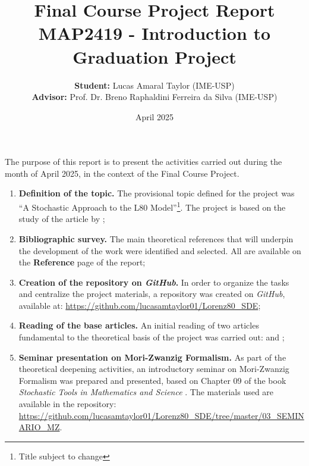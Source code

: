 \documentclass[12pt]{article}
\title{Final Course Project Report \\ \large{MAP2419 - Introduction to Graduation Project}}
\date{April 2025}
\author{
\textbf{Student:} Lucas Amaral Taylor (IME-USP)\\
\textbf{Advisor:} Prof. Dr. Breno Raphaldini Ferreira da Silva (IME-USP)
}
\begin{document}
\maketitle
The purpose of this report is to present the activities carried out during the month of April 2025, in the context of the Final Course Project.
\begin{enumerate}
    \item \textbf{Definition of the topic.} The provisional topic defined for the project was “A Stochastic Approach to the L80 Model”\footnote{Title subject to change}. The project is based on the study of the article by \citet{Chekroun2021};
          
    \item \textbf{Bibliographic survey.} The main theoretical references that will underpin the development of the work were identified and selected. All are available on the \textbf{Reference} page of the report;
          
    \item \textbf{Creation of the repository on \textit{GitHub}.} In order to organize the tasks and centralize the project materials, a repository was created on \textit{GitHub}, available at:
                 \textcolor{blue}{\href{https://github.com/lucasamtaylor01/Lorenz80_SDE}{https://github.com/lucasamtaylor01/Lorenz80_SDE}};
              
\item \textbf{Reading of the base articles.} An initial reading of two articles fundamental to the theoretical basis of the project was carried out: \citet{Chekroun2017} and \citet{Chekroun2021};
          
    \item \textbf{Seminar presentation on Mori-Zwanzig Formalism.} As part of the theoretical deepening activities, an introductory seminar on Mori-Zwanzig Formalism was prepared and presented, based on Chapter 09 of the book \textit{Stochastic Tools in Mathematics and Science} \citep{Chorin2013}. The materials used are available in the repository:
                  \textcolor{blue}{\href{https://github.com/lucasamtaylor01/Lorenz80_SDE/tree/master/03_SEMINARIO_MZ}{https://github.com/lucasamtaylor01/Lorenz80_SDE/tree/master/03_SEMINARIO_MZ}}.
\end{enumerate}

\newpage
\nocite{*}
\printbibliography
\end{document}
